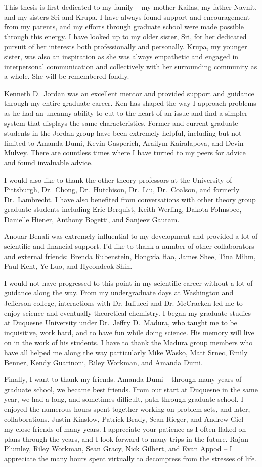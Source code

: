 This thesis is first dedicated to my family -- my mother Kailas, my father Navnit, and my sisters Sri and Krupa.
I have always found support and encouragement from my parents, and my efforts through graduate school were made possible through this energy.
I have looked up to my older sister, Sri, for her dedicated pursuit of her interests both professionally and personally.
Krupa, my younger sister, was also an inspiration as she was always empathetic and engaged in interpersonal communication and collectively with her surrounding community as a whole.
She will be remembered fondly.

Kenneth D.~Jordan was an excellent mentor and provided support and guidance through my entire graduate career.
Ken has shaped the way I approach problems as he had an uncanny ability to cut to the heart of an issue and find a simpler system that displays the same characteristics.
Former and current graduate students in the Jordan group have been extremely helpful, including but not limited to Amanda Dumi, Kevin Gasperich, Arailym Kairalapova, and Devin Mulvey.
There are countless times where I have turned to my peers for advice and found invaluable advice.

I would also like to thank the other theory professors at the University of Pittsburgh, Dr.~Chong, Dr.~Hutchison, Dr.~Liu, Dr.~Coalson, and formerly Dr.~Lambrecht.
I have also benefited from conversations with other theory group graduate students including Eric Berquist, Keith Werling, Dakota Folmsbee, Danielle Hiener, Anthony Bogetti, and Sanjeev Gautam.

Anouar Benali was extremely influential to my development and provided a lot of scientific and financial support.
I'd like to thank a number of other collaborators and external friends: Brenda Rubenstein, Hongxia Hao, James Shee, Tina Mihm, Paul Kent, Ye Luo, and Hyeondeok Shin.

I would not have progressed to this point in my scientific career without a lot of guidance along the way.
From my undergraduate days at Washington and Jefferson college, interactions with Dr. Iuliucci and Dr. McCracken led me to enjoy science and eventually theoretical chemistry.
I began my graduate studies at Duquesne University under Dr.~Jeffry D.~Madura, who taught me to be inquisitive, work hard, and to have fun while doing science.
His memory will live on in the work of his students.
I have to thank the Madura group members who have all helped me along the way particularly Mike Wasko, Matt Srnec, Emily Benner, Kendy Guarinoni, Riley Workman, and Amanda Dumi.

Finally, I want to thank my friends.
Amanda Dumi -- through many years of graduate school, we became best friends.
From our start at Duquesne in the same year, we had a long, and sometimes difficult, path through graduate school.
I enjoyed the numerous hours spent together working on problem sets, and later, collaborations.
Justin Kinslow, Patrick Brady, Sean Rieger, and Andrew Giel -- my close friends of many years.
I appreciate your patience as I often flaked on plans through the years, and I look forward to many trips in the future.
Rajan Plumley, Riley Workman, Sean Gracy, Nick Gilbert, and Evan Appod -- I appreciate the many hours spent virtually to decompress from the stresses of life.
